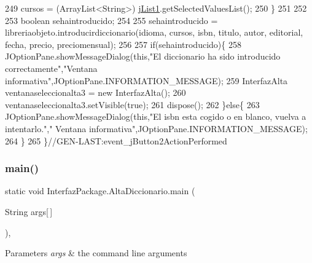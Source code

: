 \begin{DoxyCode}
249         cursos =  (ArrayList<String>) \mbox{\hyperlink{class_interfaz_package_1_1_alta_diccionario_a3d36802178dd91d9914cda26ede50e4e}{jList1}}.getSelectedValuesList();
250         \}
251         
252         
253         \textcolor{keywordtype}{boolean} sehaintroducido;
254         
255         sehaintroducido = libreriaobjeto.introducirdiccionario(idioma, cursos, isbn, titulo, autor, 
      editorial, fecha, precio, preciomensual);
256         
257         \textcolor{keywordflow}{if}(sehaintroducido)\{
258             JOptionPane.showMessageDialog(\textcolor{keyword}{this},\textcolor{stringliteral}{"El diccionario ha sido introducido correctamente"},\textcolor{stringliteral}{"Ventana
       informativa"},JOptionPane.INFORMATION\_MESSAGE);
259             InterfazAlta ventanaseleccionalta3 = \textcolor{keyword}{new} InterfazAlta();
260             ventanaseleccionalta3.setVisible(\textcolor{keyword}{true});
261             dispose();
262         \}\textcolor{keywordflow}{else}\{
263             JOptionPane.showMessageDialog(\textcolor{keyword}{this},\textcolor{stringliteral}{"El isbn esta cogido o en blanco, vuelva a intentarlo."},\textcolor{stringliteral}{"
      Ventana informativa"},JOptionPane.INFORMATION\_MESSAGE);
264         \}
265     \}\textcolor{comment}{//GEN-LAST:event\_jButton2ActionPerformed}
\end{DoxyCode}
\mbox{\label{class_interfaz_package_1_1_alta_diccionario_a6eb9af24cf87d8c74da5ffe0a368a8cc}} 
\subsubsection{\texorpdfstring{main()}{main()}}
{\footnotesize\ttfamily static void Interfaz\+Package.\+Alta\+Diccionario.\+main (\begin{DoxyParamCaption}\item[{String}]{args\mbox{[}$\,$\mbox{]} }\end{DoxyParamCaption})\hspace{0.3cm}{\ttfamily [inline]}, {\ttfamily [static]}}


\begin{DoxyParams}{Parameters}
{\em args} & the command line arguments \\
\hline
\end{DoxyParams}

